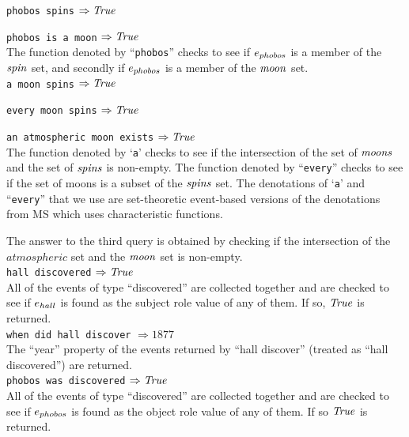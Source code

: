 \documentclass[../main.tex]{subfiles}
\begin{document}
\begin{refsection}
\texttt{phobos spins} $\Rightarrow \mathit{True}$

\noindent \texttt{phobos is a moon} $\Rightarrow \mathit{True}$ \\

The function denoted by ``\texttt{phobos}'' checks to see if $e_{phobos}$ is a member of the $\mathit{spin}$ set, and secondly if $e_{phobos}$ is a member of the $\mathit{moon}$ set. \\

\noindent \texttt{a moon spins} $\Rightarrow \mathit{True}$

\noindent \texttt{every moon spins} $\Rightarrow \mathit{True}$

\noindent \texttt{an atmospheric moon exists} $\Rightarrow \mathit{True}$ \\

The function denoted by `\texttt{a}' checks to see if the intersection of the set of $\mathit{moons}$ and the set of $\mathit{spins}$ is non-empty. The function denoted by ``\texttt{every}'' checks to see if the set of moons is a subset of the $\mathit{spins}$ set. The denotations of `\texttt{a}' and ``\texttt{every}'' that we use are set-theoretic event-based versions of the denotations from MS which uses characteristic functions.

The answer to the third query is obtained by checking if the intersection of the $\mathit{atmospheric}$ set and the $\mathit{moon}$ set is non-empty. \\

\noindent \texttt{hall discovered} $\Rightarrow \mathit{True}$ \\

All of the events of type ``discovered'' are collected together and are checked to see if $e_{hall}$ is found as the subject role value of any of them. If so, $\mathit{True}$ is returned. \\

\noindent \texttt{when did hall discover} $\Rightarrow \mathit{1877}$ \\

The ``year'' property of the  events returned by ``hall discover'' (treated as ``hall discovered'') are returned. \\

\noindent \texttt{phobos was discovered} $\Rightarrow \mathit{True}$ \\

All of the events of type ``discovered'' are collected together and are checked to see if $e_{phobos}$ is found as the object role value of any of them. If so $\mathit{True}$ is returned. \\\


\end{refsection}
\end{document}
